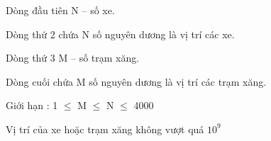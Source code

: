 Dòng đầu tiên N – số xe.   


   Dòng thứ 2 chứa N số nguyên dương là vị trí các xe.   


   Dòng thứ 3 M – số trạm xăng.   


   Dòng cuối chứa M số nguyên dương là vị trí các trạm xăng.  

    Giới hạn :      1 $\le$  M  $\le$  N  $\le$  4000   


   Vị trí của xe hoặc trạm xăng không vượt quá $10^{9}$
